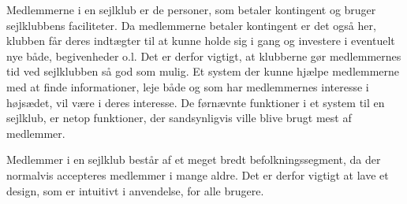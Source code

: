 Medlemmerne i en sejlklub er de personer, som betaler kontingent og bruger sejlklubbens faciliteter.  
Da medlemmerne betaler kontingent er det også her, klubben får deres indtægter til at kunne holde sig i gang og investere i eventuelt nye både, begivenheder o.l. 
Det er derfor vigtigt, at klubberne gør medlemmernes tid ved sejlklubben så god som mulig. 
Et system der kunne hjælpe medlemmerne med at finde informationer, leje både og som har medlemmernes interesse i højsædet, vil være i deres interesse.
De førnævnte funktioner i et system til en sejlklub, er netop funktioner, der sandsynligvis ville blive brugt mest af medlemmer.

Medlemmer i en sejlklub består af et meget bredt befolkningssegment, da der normalvis accepteres medlemmer i mange aldre.
Det er derfor vigtigt at lave et design, som er intuitivt i anvendelse, for alle brugere.






